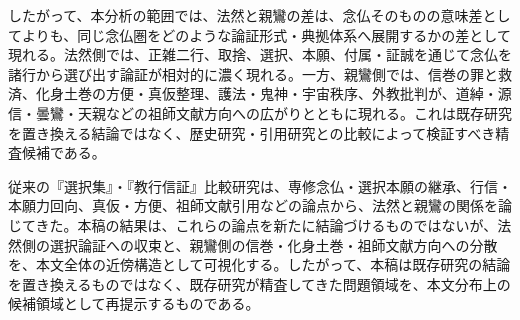 \documentclass[uplatex,dvipdfmx,11pt,a4paper]{jsarticle}
\begin{document}
したがって、本分析の範囲では、法然と親鸞の差は、念仏そのものの意味差としてよりも、同じ念仏圏をどのような論証形式・典拠体系へ展開するかの差として現れる。法然側では、正雑二行、取捨、選択、本願、付属・証誠を通じて念仏を諸行から選び出す論証が相対的に濃く現れる。一方、親鸞側では、信巻の罪と救済、化身土巻の方便・真仮整理、護法・鬼神・宇宙秩序、外教批判が、道綽・源信・曇鸞・天親などの祖師文献方向への広がりとともに現れる。これは既存研究を置き換える結論ではなく、歴史研究・引用研究との比較によって検証すべき精査候補である。

従来の『選択集』・『教行信証』比較研究は、専修念仏・選択本願の継承、行信・本願力回向、真仮・方便、祖師文献引用などの論点から、法然と親鸞の関係を論じてきた。本稿の結果は、これらの論点を新たに結論づけるものではないが、法然側の選択論証への収束と、親鸞側の信巻・化身土巻・祖師文献方向への分散を、本文全体の近傍構造として可視化する。したがって、本稿は既存研究の結論を置き換えるものではなく、既存研究が精査してきた問題領域を、本文分布上の候補領域として再提示するものである。
\end{document}
